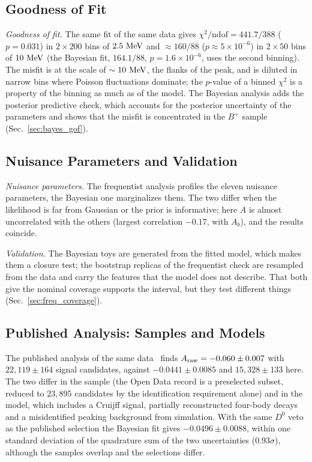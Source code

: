 \subsection{Goodness of Fit}
\emph{Goodness of fit.} The same fit of the same data gives $\chi^2/\mathrm{ndof}=441.7/388$ ($p=0.031$) in $2\times200$ bins of $2.5\,\,\text{Me\hspace{-.08em}V}$ and $\approx160/88$ ($p\approx5\times10^{-6}$) in $2\times50$ bins of $10\,\,\text{Me\hspace{-.08em}V}$ (the Bayesian fit, $164.1/88$, $p=1.6\times10^{-6}$, uses the second binning). The misfit is at the scale of $\sim10\,\,\text{Me\hspace{-.08em}V}$, the flanks of the peak, and is diluted in narrow bins where Poisson fluctuations dominate; the $p$-value of a binned $\chi^2$ is a property of the binning as much as of the model. The Bayesian analysis adds the posterior predictive check, which accounts for the posterior uncertainty of the parameters and shows that the misfit is concentrated in the $B^+$ sample (Sec.~\ref{sec:bayes_gof}).

\subsection{Nuisance Parameters and Validation}
\emph{Nuisance parameters.} The frequentist analysis profiles the eleven nuisance parameters, the Bayesian one marginalizes them. The two differ when the likelihood is far from Gaussian or the prior is informative; here $A$ is almost uncorrelated with the others (largest correlation $-0.17$, with $A_b$), and the results coincide.

\emph{Validation.} The Bayesian toys are generated from the fitted model, which makes them a closure test; the bootstrap replicas of the frequentist check are resampled from the data and carry the features that the model does not describe. That both give the nominal coverage supports the interval, but they test different things (Sec.~\ref{sec:freq_coverage}).

\subsection{Published Analysis: Samples and Models}
The published analysis of the same data~\cite{lhcb_cpv_2013} finds $A_{\mathrm{raw}}=-0.060\pm0.007$ with $22{,}119\pm164$ signal candidates, against $-0.0441\pm0.0085$ and $15{,}328\pm133$ here. The two differ in the sample (the Open Data record is a preselected subset, reduced to $23{,}895$ candidates by the identification requirement alone) and in the model, which includes a Cruijff signal, partially reconstructed four-body decays and a misidentified peaking background from simulation. With the same $D^0$ veto as the published selection the Bayesian fit gives $-0.0496\pm0.0088$, within one standard deviation of the quadrature sum of the two uncertainties ($0.93\sigma$), although the samples overlap and the selections differ.

